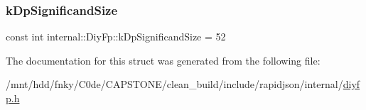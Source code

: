 \mbox{\label{structinternal_1_1DiyFp_a037aed0fa0b66af0a13657418edef19e}} 
\subsubsection{\texorpdfstring{k\+Dp\+Significand\+Size}{kDpSignificandSize}}
{\footnotesize\ttfamily const int internal\+::\+Diy\+Fp\+::k\+Dp\+Significand\+Size = 52\hspace{0.3cm}{\ttfamily [static]}}



The documentation for this struct was generated from the following file\+:\begin{DoxyCompactItemize}
\item 
/mnt/hdd/fnky/\+C0de/\+C\+A\+P\+S\+T\+O\+N\+E/clean\+\_\+build/include/rapidjson/internal/\hyperlink{diyfp_8h}{diyfp.\+h}\end{DoxyCompactItemize}
